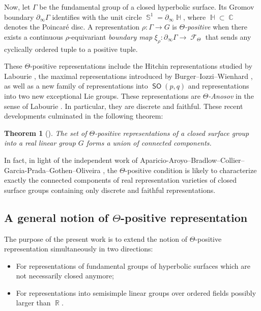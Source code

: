 \documentclass{amsart}
\theoremstyle{plain}
\newtheorem{theorem}[proposition]{Theorem}
\theoremstyle{definition}
\DeclareMathOperator{\SO}{\mathsf{SO}}
\DeclareMathOperator{\R}{\mathbb{R}}
\DeclareMathOperator{\Fc}{\mathcal{F}}
\DeclareMathOperator{\Cb}{\mathbb{C}}
\DeclareMathOperator{\Hb}{\mathbb{H}}
\DeclareMathOperator{\Sb}{\mathbb{S}}
\newcommand{\1}{\mathbf{1}}
\begin{document}
Now, let $\Gamma$ be the fundamental group of a closed hyperbolic surface. Its Gromov boundary $\partial_\infty \Gamma$ identifies with the unit circle $\Sb^1 = \partial_\infty \Hb$, where $\Hb \subset \Cb$ denotes the Poincaré disc. A representation $\rho\colon \Gamma \to G$ is \emph{$\Theta$-positive} when there exists a continuous $\rho$-equivariant \emph{boundary map} $\xi_\rho: \partial_\infty \Gamma \to \Fc_\Theta$ that sends any cyclically ordered tuple to a positive tuple.

These $\Theta$-positive representations include the Hitchin representations studied by Labourie \cite{Lab}, the maximal representations introduced by Burger--Iozzi--Wienhard \cite{BIW03,BIW10}, as well as a new family of representations into $\SO(p,q)$ and representations into two new exceptional Lie groups. These representations are \emph{$\Theta$-Anosov} in the sense of Labourie \cite{Lab}. In particular, they are discrete and faithful. These recent developments culminated in the following theorem:

\begin{theorem}[\cite{GLW, BeyrerGuichardLabouriePozzettiWienhard_PositivityCrossRatiosCollarLemma}]
    The set of $\Theta$-positive representations of a closed surface group into a real linear group $G$ forms a union of connected components.
\end{theorem}

In fact, in light of the independent work of Aparicio-Aroyo--Bradlow--Collier--Garcia-Prada--Gothen--Oliveira \cite{aparicio2019so}, the $\Theta$-positive condition is likely to characterize exactly the connected components of real representation varieties of closed surface groups containing only discrete and faithful representations.

\subsection{%
\texorpdfstring{%
A general notion of $\Theta$-positive representation}%
{A general notion of Theta-positive representation}}
\label{subsection:Intro:GeneralNotionThetaPosRepr}
The purpose of the present work is to extend the notion of $\Theta$-positive representation simultaneously in two directions:
\begin{itemize}
    \item For representations of fundamental groups of hyperbolic surfaces which are not necessarily closed anymore;
    \item For representations into semisimple linear groups over ordered fields possibly larger than $\R$.
\end{itemize}
\end{document}
